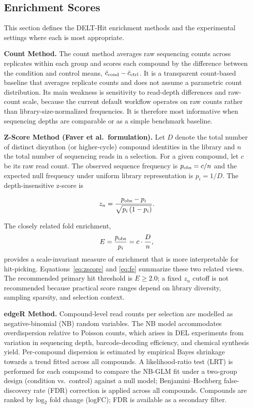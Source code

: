 \subsection{Enrichment Scores}
\label{supp:enrichment-scores}

This section defines the DELT-Hit enrichment methods and the experimental
settings where each is most appropriate.

\textbf{Count Method.}
The count method averages raw sequencing counts across replicates within each
group and scores each compound by the difference between the condition
and control means, $\bar{c}_{\rm cond} - \bar{c}_{\rm ctrl}$. It is a
transparent count-based baseline that averages replicate counts and does not
assume a parametric count distribution. Its main weakness is sensitivity to
read-depth differences and raw-count scale, because the current default workflow
operates on raw counts rather than library-size-normalized frequencies. It is
therefore most informative when sequencing depths are comparable or as a simple
benchmark baseline.

\textbf{Z-Score Method (Faver et al.\ formulation).}
Let $D$ denote the total number of distinct disynthon (or higher-cycle) compound
identities in the library and $n$ the total number of sequencing reads in a
selection. For a given compound, let $c$ be its raw read count. The observed
sequence frequency is $p_{\rm obs} = c / n$ and the expected null frequency under
uniform library representation is $p_i = 1/D$. The depth-insensitive z-score
is\cite{faver_quantitativecomparisonenrichment_2019}

\begin{equation}
z_n = \frac{p_{\rm obs} - p_i}{\sqrt{p_i\,(1 - p_i)}}.
\label{eq:zscore}
\end{equation}

The closely related fold enrichment,
\begin{equation}
E = \frac{p_{\rm obs}}{p_i} = c \cdot \frac{D}{n},
\label{eq:fe}
\end{equation}
provides a scale-invariant measure of enrichment that is more interpretable for
hit-picking. Equations~\ref{eq:zscore} and \ref{eq:fe} summarize these two
related views. The recommended primary hit threshold is $E \geq 2.0$; a fixed
$z_n$ cutoff is not recommended because practical score ranges depend on
library diversity, sampling sparsity, and selection context.

\textbf{edgeR Method.}
Compound-level read counts per selection are modelled as negative-binomial
(NB) random variables. The NB model accommodates overdispersion relative to
Poisson counts, which arises in DEL experiments from variation in sequencing
depth, barcode-decoding efficiency, and chemical synthesis yield. Per-compound
dispersion is estimated by empirical Bayes shrinkage towards a trend fitted
across all compounds\cite{robinson_edgerbioconductorpackage_2010}. A likelihood-ratio test (LRT) is performed
for each compound to compare the NB-GLM fit under a two-group design
(condition vs.\ control) against a null model; Benjamini--Hochberg
false-discovery rate (FDR) correction is applied across all compounds.
Compounds are ranked by log$_2$ fold change (logFC); FDR is available as a
secondary filter.
